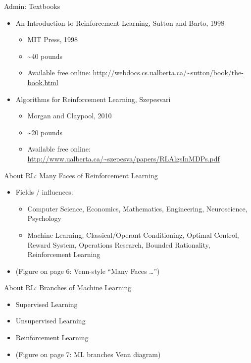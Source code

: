 \documentclass[presentation]{beamer}
\begin{document}
\begin{frame}[label={sec:org84616b0}]{Admin: Textbooks}
\begin{itemize}
\item \alert{An Introduction to Reinforcement Learning}, Sutton and Barto, 1998
\begin{itemize}
\item MIT Press, 1998
\item \textasciitilde{}40 pounds
\item Available free online: \url{http://webdocs.cs.ualberta.ca/\~sutton/book/the-book.html}
\end{itemize}
\item \alert{Algorithms for Reinforcement Learning}, Szepesvari
\begin{itemize}
\item Morgan and Claypool, 2010
\item \textasciitilde{}20 pounds
\item Available free online: \url{http://www.ualberta.ca/\~szepesva/papers/RLAlgsInMDPs.pdf}
\end{itemize}
\end{itemize}
\end{frame}
\begin{frame}[label={sec:org140c2bd}]{About RL: Many Faces of Reinforcement Learning}
\begin{itemize}
\item Fields / influences:
\begin{itemize}
\item Computer Science, Economics, Mathematics, Engineering, Neuroscience, Psychology
\item Machine Learning, Classical/Operant Conditioning, Optimal Control, Reward System,
Operations Research, Bounded Rationality, Reinforcement Learning
\end{itemize}
\item (Figure on page 6: Venn-style “Many Faces …”)
\end{itemize}
\end{frame}
\begin{frame}[label={sec:org531596b}]{About RL: Branches of Machine Learning}
\begin{itemize}
\item Supervised Learning
\item Unsupervised Learning
\item Reinforcement Learning
\item (Figure on page 7: ML branches Venn diagram)
\end{itemize}
\end{frame}
\end{document}
